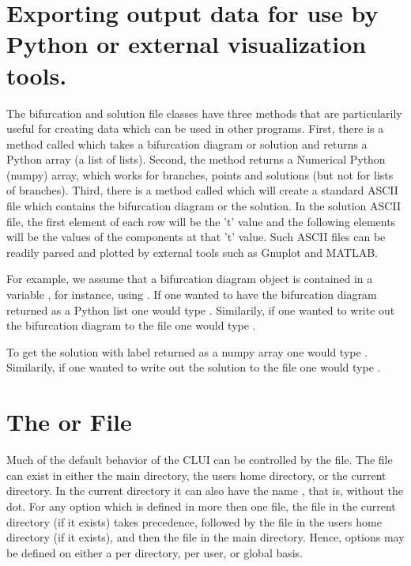 \documentclass[12pt]{report}
\begin{document}
 \section{ Exporting output data for use by Python or external
   visualization tools.} \label{sec:clui_exporting}

 The bifurcation and solution file classes have three methods that are 
 particularily useful for creating data which can be used in other
 programs.  First, there is a method called  which
 takes a bifurcation diagram or solution and
 returns a Python array (a list of lists). Second, the method
  returns a Numerical Python (numpy) array,
 which works for
 branches, points and solutions (but not for lists of branches).
 Third, there is a method called
  which will create a standard ASCII file
 which contains the bifurcation diagram or the solution. 
 In the solution ASCII file, the first element of each row will be
 the 't' value and the following elements will be the
 values of the components at that 't' value. Such ASCII files
 can be readily parsed and plotted by external tools such as
 Gnuplot and MATLAB.

 For example, we assume
 that a bifurcation diagram object is contained in a variable
 , for instance, using .  If
 one wanted to have the bifurcation diagram returned as a Python list
 one would type .  Similarily, if one wanted
 to write out the bifurcation diagram to the file 
 one would type .

 To get the solution with label  returned as a numpy
 array one would type .
 Similarily, if one wanted to write out the solution
 to the file  one would type
 .

 \section{ The  or  File }

 Much of the default behavior of the \AUTO CLUI
 can be controlled by the  file.
 The  file can exist in
 either the main \AUTO directory, the users
 home directory, or the current directory. In the current directory
 it can also have the name , that is, without the dot.
 For any
 option which is defined in more then one file, 
 the  file
 in the current directory (if it exists) takes precedence, 
 followed by the  file
 in the users home directory (if it exists), and then the
  file in the main \AUTO directory.  Hence, 
 options may be defined on either a per directory, per
 user, or global basis.  
\end{document}
